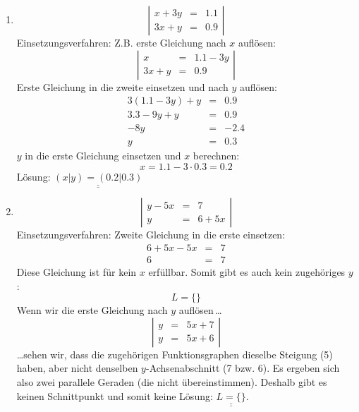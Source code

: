 \documentclass[%
11pt,%
twoside,%
titlepage,%
german,%
]{scrartcl}
\newcommand{\result}[1]{\underline{\underline{#1}}}
\begin{document}
\begin{enumerate}
\begin{enumerate}
  \item 
    \begin{displaymath}
      \left| 
        \begin{array}{rcl}
        x+3y & = & 1.1 \\
        3x+y & = & 0.9
        \end{array} \right|
    \end{displaymath}
    Einsetzungsverfahren: Z.B. erste Gleichung nach $x$ aufl\"osen:
    \begin{displaymath}
      \left| 
        \begin{array}{rcl}
        x & = & 1.1-3y \\
        3x+y & = & 0.9
        \end{array} \right|
    \end{displaymath}
    Erste Gleichung in die zweite einsetzen und nach $y$ aufl\"osen:
    \begin{eqnarray*}
      3(1.1-3y)+y & = & 0.9 \\
      3.3-9y + y & = & 0.9 \\
      -8y & = & - 2.4 \\
      y & = & 0.3
    \end{eqnarray*}
    $y$ in die erste Gleichung einsetzen und $x$ berechnen:
    \begin{displaymath}
      x = 1.1-3\cdot 0.3 = 0.2
    \end{displaymath}
    L\"osung: $\result{(x|y)=(0.2|0.3)}$

  \item 
    \begin{displaymath}
      \left| 
        \begin{array}{rcl}
         y-5x & = & 7 \\
          y & = & 6+5x
        \end{array} \right|
    \end{displaymath}
    Einsetzungsverfahren: Zweite Gleichung in die erste einsetzen:
    \begin{eqnarray*}
      6+5x - 5x & = & 7 \\
      6 & = & 7
    \end{eqnarray*}
    Diese Gleichung ist f\"ur kein $x$ erf\"ullbar. Somit gibt es auch kein zugeh\"origes $y$:
    \begin{displaymath}
      L = \{\}
    \end{displaymath}
    Wenn wir die erste Gleichung nach $y$ aufl\"osen\,\ldots
    \begin{displaymath}
      \left| 
        \begin{array}{rcl}
         y & = & 5x+7 \\
         y & = & 5x+6
        \end{array} \right|
    \end{displaymath}
    \ldots sehen wir, dass die zugeh\"origen Funktionsgraphen dieselbe Steigung (5) haben, aber nicht denselben $y$-Achsenabschnitt (7 bzw. 6). Es ergeben sich also zwei parallele Geraden (die nicht \"ubereinstimmen). Deshalb gibt es keinen Schnittpunkt und somit keine L\"osung: $\result{L=\{\}}$.


\end{enumerate}
\end{enumerate}
\end{document}
